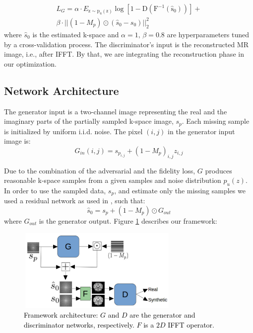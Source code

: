 \documentclass[review]{elsarticle}
\begin{document}
\begin{equation}
\begin{aligned}L_{G}=\alpha\cdot E_{\mathrm{z\sim p_{u}\left(z\right)}}\mathrm{\log\left[1-D\left(F^{-1}\left(\hat{s}_{0}\right)\right)\right]}+\\
\beta\cdot||\left(1-M_{p}\right)\odot\left(\hat{s}_{0}-s_{0}\right)||_{2}^{2}
\end{aligned}
\end{equation}
where $\hat{s}_{0}$ is the estimated k-space and $\alpha=1,\,\beta=0.8$
are hyperparameters tuned by a cross-validation process. The discriminator's
input is the reconstructed MR image,\textbf{ }i.e.,\textbf{ }after
IFFT. By that, we are integrating the reconstruction phase in our
optimization.


\subsection{Network Architecture}

The generator input is a two-channel image representing the real and
the imaginary parts of the partially sampled k-space image, $s_{p}$.
Each missing sample is initialized by uniform i.i.d. noise. The pixel
$\left(i,j\right)$ in the generator input image is: 
\begin{equation}
G_{in}\left(i,j\right)=s_{p_{i,j}}+\left(1-M_{p}\right)_{i,j}z_{i,j}
\end{equation}

Due to the combination of the adversarial and the fidelity loss, $G$
produces reasonable k-space samples from a given samples and noise
distribution $p_{u}\left(z\right)$. In order to use the sampled data,
$s_{p}$, and estimate only the missing samples we used a residual
network \cite{he2016deep} as used in \cite{Oktay2016}, such that:
\begin{equation}
\hat{s}_{0}=s_{p}+\left(1-M_{p}\right)\odot G_{out}
\end{equation}
where $G_{out}$ is the generator output. Figure \ref{fig:system}
describes our framework:

\begin{figure}[H]
	\centering{}\includegraphics[width=7.8cm,height=4cm]{include/grp1/chart}\caption{\label{fig:system} \textcolor{black}{\footnotesize{}{}Framework
			architecture: $G$ and $D$ are the generator and discriminator networks,
			respectively. $F$ is a $2D$ IFFT operator.}}
\end{figure}
\end{document}
